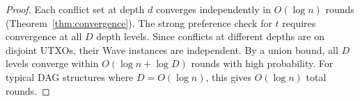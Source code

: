 \begin{proof}
Each conflict set at depth $d$ converges independently in $O(\log n)$ rounds
(Theorem~\ref{thm:convergence}). The strong preference check for $t$ requires convergence
at all $D$ depth levels. Since conflicts at different depths are on disjoint UTXOs, their
Wave instances are independent. By a union bound, all $D$ levels converge within
$O(\log n + \log D)$ rounds with high probability. For typical DAG structures where
$D = O(\log n)$, this gives $O(\log n)$ total rounds.
\end{proof}

